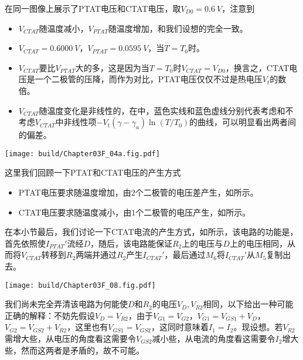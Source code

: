 在同一图像上展示了PTAT电压和CTAT电压，取$V_{D0}=\SI{0.6}{V}$，注意到
\begin{itemize}
    \item $V_{CTAT}$随温度减小，$V_{PTAT}$随温度增加，和我们设想的完全一致。
    \item $V_{CTAT}=\SI{0.6000}{V}$，$V_{PTAT}=\SI{0.0595}{V}$，当$T=T_0$时。
    \item $V_{CTAT}$要比$V_{PTAT}$大的多，这是因为当$T=T_0$时$V_{CTAT}=V_{D0}$，换言之，CTAT电压是一个二极管的压降，而作为对比，PTAT电压仅仅不过是热电压$V_t$的数倍。
    \item $V_{CTAT}$随温度变化是非线性的，在中，蓝色实线和蓝色虚线分别代表考虑和不考虑$V_{CTAT}$中非线性项$-V_t(\gamma-\gamma_a)\ln(T/T_0)$的曲线，可以明显看出两者间的偏差。
\end{itemize}
\begin{Figure}[PTAT电压和CTAT电压]
    \texttt{[image: build/Chapter03F\_04a.fig.pdf]}
\end{Figure}

这里我们回顾一下PTAT和CTAT电压的产生方式
\begin{itemize}
    \item PTAT电压要求随温度增加，由$2$个二极管的电压差产生，如所示。
    \item CTAT电压要求随温度减小，由$1$个二极管的电压产生，如所示。
\end{itemize}
在本小节最后，我们讨论一下CTAT电流的产生方式，如所示，该电路的功能是，首先依照使$I_{PTAT}'$流经$D$，随后，该电路能保证$R_2$上的电压与$D$上的电压相同，从而将$V_{CTAT}$转移到$R_2$两端并通过$R_2$产生$I_{CTAT}'$，最后通过$M_6$将$I_{CTAT}'$从$M_5$复制出去。
\begin{Figure}[CTAT电流产生电路]
    \texttt{[image: build/Chapter03F\_08.fig.pdf]}
\end{Figure}
我们尚未完全弄清该电路为何能使$D$和$R_2$的电压$V_{D},V_{R2}$相同，以下给出一种可能正确的解释：不妨先假设$V_{D}=V_{R2}$，由于$V_{G1}=V_{G2}$，$V_{G1}=V_{GS1}+V_D$，$V_{G2}=V_{GS2}+V_{R2}$，这里也有$V_{GS1}=V_{GS2}$，这同时意味着$I_1=I_2$。现设想。若$V_{R2}$需增大些，从电压的角度看这需要令$V_{GS2}$减小些，从电流的角度看这需要令$I_2$增大些，然而这两者是矛盾的，故不可能。

